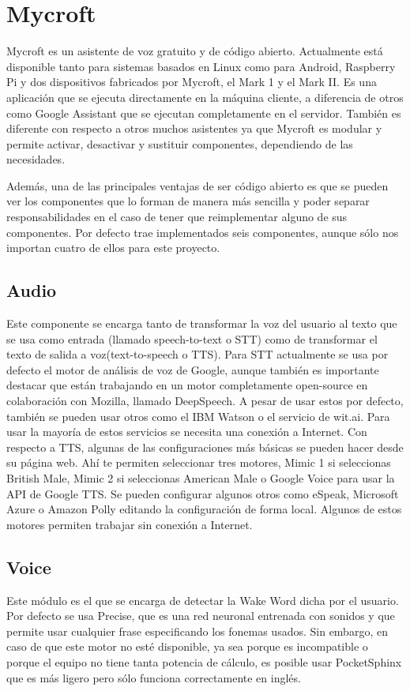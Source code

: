 \section{Mycroft}
Mycroft es un asistente de voz gratuito y de código abierto. Actualmente está disponible tanto para sistemas basados en Linux como para Android, Raspberry Pi y dos dispositivos fabricados por Mycroft, el Mark 1 y el Mark II.
Es una aplicación que se ejecuta directamente en la máquina cliente, a diferencia de otros como Google Assistant que se ejecutan completamente en el servidor. También es diferente con respecto a otros muchos asistentes ya que Mycroft es modular y permite activar, desactivar y sustituir componentes, dependiendo de las necesidades.

Además, una de las principales ventajas de ser código abierto es que se pueden ver los componentes que lo forman de manera más sencilla y poder separar responsabilidades en el caso de tener que reimplementar alguno de sus componentes. Por defecto trae implementados seis componentes, aunque sólo nos importan cuatro de ellos para este proyecto.
\subsection{Audio}
Este componente se encarga tanto de transformar la voz del usuario al texto que se usa como entrada (llamado speech-to-text o STT) como de transformar el texto de salida a voz(text-to-speech o TTS).
Para STT actualmente se usa por defecto el motor de análisis de voz de Google, aunque también es importante destacar que están trabajando en un motor completamente open-source en colaboración con Mozilla, llamado DeepSpeech. A pesar de usar estos por defecto, también se pueden usar otros como el IBM Watson o el servicio de wit.ai. Para usar la mayoría de estos servicios se necesita una conexión a Internet.
Con respecto a TTS, algunas de las configuraciones más básicas se pueden hacer desde su página web. Ahí te permiten seleccionar tres motores, Mimic 1 si seleccionas British Male, Mimic 2 si seleccionas American Male o Google Voice para usar la API de Google TTS. Se pueden configurar algunos otros como eSpeak, Microsoft Azure o Amazon Polly editando la configuración de forma local. Algunos de estos motores permiten trabajar sin conexión a Internet.
\subsection{Voice}
Este módulo es el que se encarga de detectar la Wake Word dicha por el usuario. Por defecto se usa Precise, que es una red neuronal entrenada con sonidos y que permite usar cualquier frase especificando los fonemas usados. Sin embargo, en caso de que este motor no esté disponible, ya sea porque es incompatible o porque el equipo no tiene tanta potencia de cálculo, es posible usar PocketSphinx que es más ligero pero sólo funciona correctamente en inglés.
